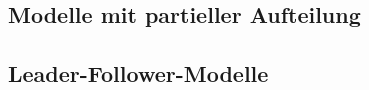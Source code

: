       \subsection{Modelle mit partieller Aufteilung} %
      \label{sub:modelle_mit_partieller_aufteilung}
      

      \subsection{Leader-Follower-Modelle} %
      \label{sub:leader_follower_modelle}
      
    




    
